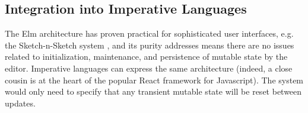 \subsection{Integration into Imperative Languages}
\label{sec:imperative-langs}
The Elm architecture has proven practical for sophisticated user interfaces, 
e.g. the Sketch-n-Sketch system \cite{sns-uist}, 
and its purity addresses means there are no issues 
related to initialization, maintenance, and persistence of mutable state
by the editor.
Imperative languages can express the same architecture (indeed, a close cousin 
is at the heart of the popular React framework for Javascript).
The system would only need to specify that any transient mutable state will be reset between updates.

